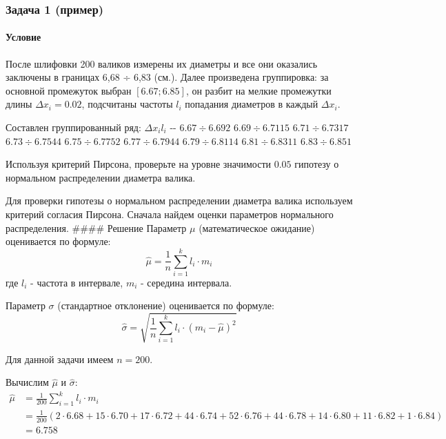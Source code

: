 \documentclass[11pt]{article}
\begin{document}
    \subsubsection{Задача 1
(пример)}\label{ux437ux430ux434ux430ux447ux430-1-ux43fux440ux438ux43cux435ux440}

\paragraph{Условие}\label{ux443ux441ux43bux43eux432ux438ux435}

После шлифовки 200 валиков измерены их диаметры и все они оказались
заключены в границах 6,68 ÷ 6,83 (см.). Далее произведена группировка:
за основной промежуток выбран \(\left[6.67;6.85\right]\), он разбит на
мелкие промежутки длины \(\Delta x_i = 0.02\), подсчитаны частоты
\(l_i\) попадания диаметров в каждый \(\Delta x_i\).

Составлен группированный ряд:
\textbar{}\(\Delta x_i\)\textbar{}\(l_i\)\textbar{}
\textbar-\textbar-\textbar{}
\textbar{}\(6.67 \div 6.69\)\textbar{}\(2\)\textbar{}
\textbar{}\(6.69 \div 6.71\)\textbar{}\(15\)\textbar{}
\textbar{}\(6.71 \div 6.73\)\textbar{}\(17\)\textbar{}
\textbar{}\(6.73 \div 6.75\)\textbar{}\(44\)\textbar{}
\textbar{}\(6.75 \div 6.77\)\textbar{}\(52\)\textbar{}
\textbar{}\(6.77 \div 6.79\)\textbar{}\(44\)\textbar{}
\textbar{}\(6.79 \div 6.81\)\textbar{}\(14\)\textbar{}
\textbar{}\(6.81 \div 6.83\)\textbar{}\(11\)\textbar{}
\textbar{}\(6.83 \div 6.85\)\textbar{}\(1\)\textbar{}

Используя критерий Пирсона, проверьте на уровне значимости \(0.05\)
гипотезу о нормальном распределении диаметра валика.

Для проверки гипотезы о нормальном распределении диаметра валика
используем критерий согласия Пирсона. Сначала найдем оценки параметров
нормального распределения. \#\#\#\# Решение Параметр \(\mu\)
(математическое ожидание) оценивается по формуле: \[
\hat{\mu} = \frac{1}{n} \sum_{i=1}^{k} l_i \cdot m_i
\] где \(l_i\) - частота в интервале, \(m_i\) - середина интервала.

Параметр \(\sigma\) (стандартное отклонение) оценивается по формуле: \[
\hat{\sigma} = \sqrt{\frac{1}{n} \sum_{i=1}^{k} l_i \cdot (m_i - \hat{\mu})^2}
\]

Для данной задачи имеем \(n=200\).

Вычислим \(\hat{\mu}\) и \(\hat{\sigma}\): \[
\begin{align*}
\hat{\mu} &= 
\frac{1}{200} \sum_{i=1}^{k} l_i \cdot m_i \\ 
&= \frac{1}{200} \left(2 \cdot 6.68 + 15 \cdot 6.70 + 17 \cdot 6.72 + 44 \cdot 6.74 + 52 \cdot 6.76 + 44 \cdot 6.78 + 14 \cdot 6.80 + 11 \cdot 6.82 + 1 \cdot 6.84\right) \\
&= 6.758
\end{align*}
\]
\end{document}
